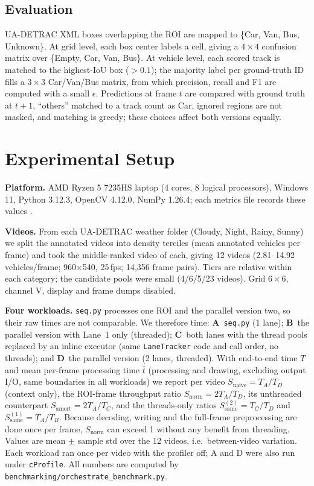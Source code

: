 \documentclass[conference]{IEEEtran}
\newcommand{\code}[1]{\texttt{#1}}
\begin{document}
\subsection{Evaluation}
\label{sec:eval}
UA-DETRAC XML boxes overlapping the ROI are mapped to \{Car, Van, Bus,
Unknown\}. At grid level, each box center labels a cell, giving a
$4\times4$ confusion matrix over \{Empty, Car, Van, Bus\}. At vehicle
level, each scored track is matched to the highest-IoU box ($>0.1$); the
majority label per ground-truth ID fills a $3\times3$ Car/Van/Bus matrix,
from which precision, recall and F1 are computed with a small
$\epsilon$. Predictions at frame $t$ are compared with ground truth at
$t{+}1$, ``others'' matched to a track count as Car, ignored regions are
not masked, and matching is greedy; these choices affect both versions
equally.

\section{Experimental Setup}
\label{sec:experiments}
\textbf{Platform.} AMD Ryzen 5 7235HS laptop (4 cores, 8 logical
processors), Windows 11, Python 3.12.3, OpenCV 4.12.0, NumPy 1.26.4;
each metrics file records these values \cite{beyer2019}.

\textbf{Videos.} From each UA-DETRAC weather folder (Cloudy, Night,
Rainy, Sunny) we split the annotated videos into density terciles (mean
annotated vehicles per frame) and took the middle-ranked video of each,
giving 12 videos (2.81--14.92 vehicles/frame; 960$\times$540, 25\,fps;
14{,}356 frame pairs). Tiers are relative within each category; the
candidate pools were small (4/6/5/23 videos). Grid $6\times6$, channel V,
display and frame dumps disabled.

\textbf{Four workloads.} \code{seq.py} processes one ROI and the
parallel version two, so their raw times are not comparable. We
therefore time: \textbf{A}~\code{seq.py} (1 lane); \textbf{B}~the parallel
version with Lane~1 only (threaded); \textbf{C}~both lanes with the
thread pools replaced by an inline executor (same \code{LaneTracker} code
and call order, no threads); and \textbf{D}~the parallel version (2
lanes, threaded). With end-to-end time $T$ and mean per-frame
processing time $\bar t$ (processing and drawing, excluding output I/O,
same boundaries in all workloads) we report per video
$S_{\text{naive}}=T_A/T_D$ (context only), the ROI-frame throughput ratio
$S_{\text{norm}}=2T_A/T_D$, its unthreaded counterpart
$S_{\text{amort}}=2T_A/T_C$, and the threads-only ratios
$S_{\text{same}}^{(2)}=T_C/T_D$ and $S_{\text{same}}^{(1)}=T_A/T_B$.
Because decoding, writing and the full-frame preprocessing are done once
per frame, $S_{\text{norm}}$ can exceed 1 without any benefit from
threading. Values are mean $\pm$ sample std over the 12 videos, i.e.\
between-video variation. Each workload ran once per video with the
profiler off; A and D were also run under \code{cProfile}. All numbers
are computed by \code{benchmarking/orchestrate\_benchmark.py}.
\end{document}
